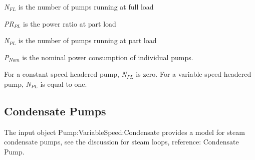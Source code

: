 \emph{N\(_{FL}\)} is the number of pumps running at full load

\emph{PR\(_{PL}\)} is the power ratio at part load

\emph{N\(_{PL}\)} is the number of pumps running at part load

\emph{P\(_{Nom}\)} is the nominal power consumption of individual pumps.

For a constant speed headered pump, \emph{N\(_{PL}\)} is zero. For a variable speed headered pump, \emph{N\(_{PL}\)} is equal to one.

\subsection{Condensate Pumps}\label{condensate-pumps}

The input object Pump:VariableSpeed:Condensate provides a model for steam condensate pumps, see the discussion for steam loops, reference: Condensate Pump.
